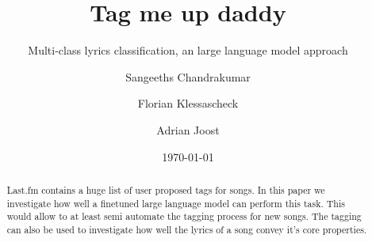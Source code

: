 

\titlehead{BSc Computational and Data Science\\CDS1091 Natural Language Processing\\Dozent: Corsin Capol\hfill}
\title{Tag me up daddy}
\subtitle{Multi-class lyrics classification, an large language model approach}
\author[1,*]{Sangeeths Chandrakumar}
\author[1]{Florian Klessascheck}
\author[1]{Adrian Joost}
\date{\today}
\maketitle

\begin{abstract}
Last.fm contains a huge list of user proposed tags for songs. In this paper we investigate how well a finetuned large language model can perform this task. This would allow to at least semi automate the tagging process for new songs. The tagging can also be used to investigate how well the lyrics of a song convey it's core properties.
\end{abstract}
